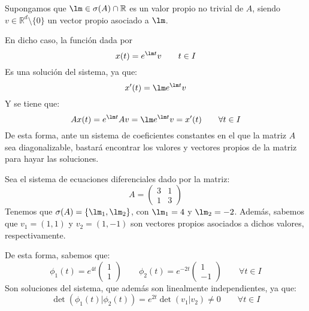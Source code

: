 Supongamos que $\lm \in \sigma(A)\cap \mathbb{R}$ es un valor propio no trivial de $A$, siendo $v\in \mathbb{R}^d\setminus\{0\}$ un vector propio asociado a $\lm$.

En dicho caso, la función dada por
\begin{equation*}
    x(t) = e^{\lm t} v \qquad t\in I
\end{equation*}
Es una solución del sistema, ya que:
\begin{equation*}
    x'(t) = \lm e^{\lm t} v 
\end{equation*}
Y se tiene que:
\begin{equation*}
    Ax(t) = e^{\lm t} Av = \lm e^{\lm t} v = x'(t) \qquad \forall t\in I
\end{equation*}
De esta forma, ante un sistema de coeficientes constantes en el que la matriz $A$ sea diagonalizable, bastará encontrar los valores y vectores propios de la matriz para hayar las soluciones.

\begin{ejemplo}
    Sea el sistema de ecuaciones diferenciales dado por la matriz:
    \begin{equation*}
        A = \left(\begin{array}{cc}
                3 & 1 \\
                1 & 3
        \end{array}\right)
    \end{equation*}
    Tenemos que $\sigma(A) = \{\lm_1, \lm_2\}$, con $\lm_1 = 4$ y $\lm_2 = -2$. Además, sabemos que $v_1=(1, 1)$ y $v_2 = (1, -1)$ son vectores propios asociados a dichos valores, respectivamente.

    De esta forma, sabemos que:
    \begin{equation*}
        \phi_1(t) = e^{4t} \left(\begin{array}{c}
            1 \\
            1
        \end{array}\right) \qquad 
        \phi_2(t) = e^{-2t} \left(\begin{array}{c}
            1 \\
            -1
        \end{array}\right) \qquad \forall t\in I
    \end{equation*}
    Son soluciones del sistema, que además son linealmente independientes, ya que:
    \begin{equation*}
        \det(\phi_1(t)|\phi_2(t)) = e^{2t} \det(v_1|v_2) \neq 0 \qquad \forall t\in I
    \end{equation*}
\end{ejemplo}

